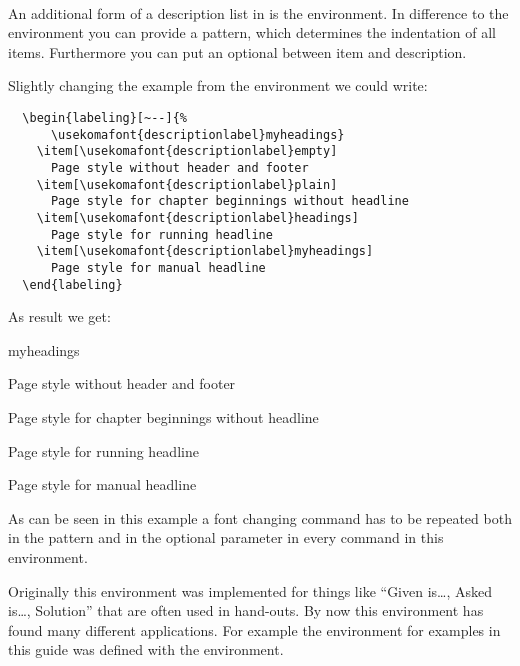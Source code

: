 \begin{Declaration}
  \\
\end{Declaration}%
%
%
An additional form of a description list in {\KOMAScript} is the
 environment. In difference to the
 environment you can provide a pattern, which
determines the indentation of all items. Furthermore you can put an
optional  between item and description.
\begin{Example}
  Slightly changing the example from the 
  environment we could write:
\begin{lstlisting}
  \begin{labeling}[~--]{%
      \usekomafont{descriptionlabel}myheadings}
    \item[\usekomafont{descriptionlabel}empty]
      Page style without header and footer
    \item[\usekomafont{descriptionlabel}plain]
      Page style for chapter beginnings without headline
    \item[\usekomafont{descriptionlabel}headings]
      Page style for running headline
    \item[\usekomafont{descriptionlabel}myheadings]
      Page style for manual headline
  \end{labeling}
\end{lstlisting}
  As result we get:
  \begin{ShowOutput}
    \begin{labeling}[~--]{myheadings}
      \item[\usekomafont{descriptionlabel}empty]
      Page style without header and footer
    \item[\usekomafont{descriptionlabel}plain]
      Page style for chapter beginnings without headline
    \item[\usekomafont{descriptionlabel}headings]
      Page style for running headline
    \item[\usekomafont{descriptionlabel}myheadings]
      Page style for manual headline
    \end{labeling}
  \end{ShowOutput}
  As can be seen in this example a font changing command has to be
  repeated both in the pattern and in the optional parameter in every
   command in this environment.
\end{Example}
Originally this environment was implemented for things like ``Given
is\dots, Asked is\dots, Solution'' that are often used in hand-outs.
By now this environment has found many different applications. For
example the environment for examples in this guide was defined with
the  environment.
%
%
%


